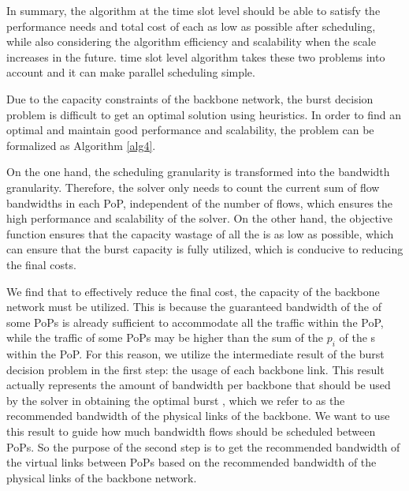 {In summary, the algorithm at the time slot level should be able to satisfy the performance needs and total cost of each {\egress} as low as possible after scheduling, while also considering the algorithm efficiency and scalability when the scale increases in the future. {\sys} time slot level algorithm takes these two problems into account and it can make parallel scheduling simple.}


{ Due to the capacity constraints of the backbone network, the {\egress} burst decision problem is difficult to get an optimal solution using heuristics. In order to find an optimal and maintain good performance and scalability, the problem can be formalized as Algorithm \ref{alg4}}.

{On the one hand, the scheduling granularity is transformed into the bandwidth granularity. Therefore, the solver only needs to count the current sum of flow bandwidths in each PoP, independent of the number of flows, which ensures the high performance and scalability of the solver. On the other hand, the objective function ensures that the capacity wastage of all the {\egresses} is as low as possible, which can ensure that the burst capacity is fully utilized, which is conducive to reducing the final costs.}


{ We find that to effectively reduce the final cost, the capacity of the backbone network must be utilized. This is because the guaranteed bandwidth of the {\egress} of some PoPs is already sufficient to accommodate all the traffic within the PoP, while the traffic of some PoPs may be higher than the sum of the $p_i$ of the {\egress}s within the PoP. For this reason, we utilize the intermediate result of the burst decision problem in the first step: the usage of each backbone link. This result actually represents the amount of bandwidth per backbone that should be used by the solver in obtaining the optimal burst {\egress}, which we refer to as the recommended bandwidth of the physical links of the backbone. We want to use this result to guide how much bandwidth flows should be scheduled between PoPs. So the purpose of the second step is to get the recommended bandwidth of the virtual links between PoPs based on the recommended bandwidth of the physical links of the backbone network.}

